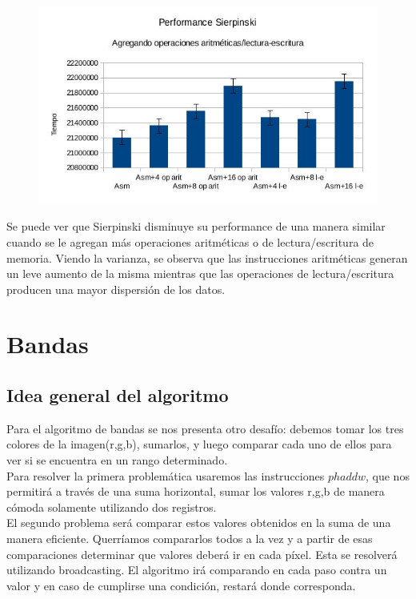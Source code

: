 \documentclass[a4paper]{article}
\begin{document}
\begin{figure}[h!]
  \begin{center}
  \includegraphics[scale=0.66]{Graficos1.5/sie/per.jpg}
  \label{nombreparareferenciar1}
  \end{center}
\end{figure}

Se puede ver que Sierpinski disminuye su performance de una manera similar cuando se le agregan más operaciones aritméticas o de lectura/escritura de memoria. Viendo la varianza, se observa que las instrucciones aritméticas generan un leve aumento de la misma mientras que las operaciones de lectura/escritura producen una mayor dispersión de los datos.
\newpage
\section{Bandas}
\subsection{Idea general del algoritmo}
Para el algoritmo de bandas se nos presenta otro desafío: debemos tomar los tres colores de la imagen(r,g,b), sumarlos, y luego comparar cada uno de ellos para ver si se encuentra en un rango determinado.
\\
Para resolver la primera problemática usaremos las instrucciones $phaddw$, que nos permitirá a través de una suma horizontal, sumar los valores r,g,b de manera cómoda solamente utilizando dos registros.
\\
El segundo problema será comparar estos valores obtenidos en la suma de una manera eficiente. Querríamos compararlos todos a la vez y a partir de esas comparaciones determinar que valores deberá ir en cada píxel. Esta se resolverá utilizando broadcasting. El algoritmo irá comparando en cada paso contra un valor y en caso de cumplirse una condición, restará donde corresponda.
\end{document}
